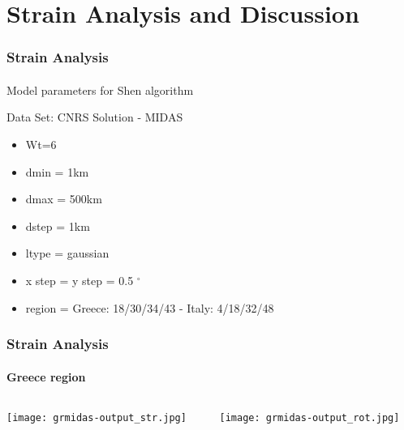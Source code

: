 \section{Strain Analysis and Discussion}
 
\graphicspath{{Chapter4/Figs/}}

\begin{frame}
 \frametitle{Strain Analysis}
 \framesubtitle{}
 \label{ch4:}
 
  Model parameters for Shen algorithm
  
  Data Set: CNRS Solution - MIDAS
  \begin{itemize}
    \item Wt=6
    \item dmin = 1km
    \item dmax = 500km
    \item dstep = 1km
    \item ltype = gaussian
    \item x step = y step = 0.5 $^{\circ}$
    \item region = Greece: 18/30/34/43 -  Italy: 4/18/32/48
  \end{itemize}

\end{frame}
\note{}

\begin{frame}
  \frametitle{Strain Analysis}
  \framesubtitle{Greece region}
  \label{ch4:}
   
  \begin{columns}
    \begin{column}{0.5\textwidth}
      \begin{center}
        \texttt{[image: grmidas-output\_str.jpg]}   
      \end{center}
    \end{column}
    \begin{column}{0.5\textwidth}
      \begin{center}
        \texttt{[image: grmidas-output\_rot.jpg]}     
      \end{center}
    \end{column}
  \end{columns}

\end{frame}
\note{}

